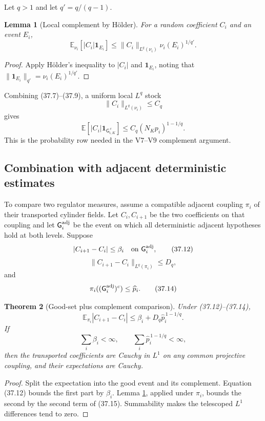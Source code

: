 \documentclass[11pt]{article}
\newtheorem{theorem}{Theorem}[section]
\newtheorem{lemma}[theorem]{Lemma}
\begin{document}
Let \(q>1\) and let \(q'=q/(q-1)\).

\begin{lemma}[Local complement by Hölder]
\label{lem:v11v37-holder}
For a random coefficient \(C_i\) and an event \(E_i\),
\[
 \mathbb E_{\nu_i}
 \left[|C_i|\mathbf1_{E_i}\right]
 \leq
 \|C_i\|_{L^q(\nu_i)}
 \nu_i(E_i)^{1/q'}.
 \tag{37.9}
\]
\end{lemma}

\begin{proof}
Apply Hölder's inequality to
\(|C_i|\) and \(\mathbf1_{E_i}\), noting that
\(\|\mathbf1_{E_i}\|_{q'}=\nu_i(E_i)^{1/q'}\).
\end{proof}

Combining (37.7)--(37.9), a uniform local \(L^q\) stock
\[
 \|C_i\|_{L^q(\nu_i)}\leq C_q
 \tag{37.10}
\]
gives
\[
 \mathbb E\left[
 |C_i|\mathbf1_{\mathsf G_{i,K}^{\,c}}
 \right]
 \leq
 C_q(N_Kp_i)^{1-1/q}.
 \tag{37.11}
\]
This is the probability row needed in the V7--V9 complement argument.

\subsection{Combination with adjacent deterministic estimates}

To compare two regulator measures, assume a compatible adjacent coupling
\(\pi_i\) of their transported cylinder fields.  Let \(C_i,C_{i+1}\)
be the two coefficients on that coupling and let
\(\mathsf G_i^{\rm adj}\) be the event on which all deterministic
adjacent hypotheses hold at both levels.  Suppose
\[
 |C_{i+1}-C_i|
 \leq\beta_i
 \quad\hbox{on }\mathsf G_i^{\rm adj},
 \tag{37.12}
\]
\[
 \|C_{i+1}-C_i\|_{L^q(\pi_i)}\leq D_q,
 \tag{37.13}
\]
and
\[
 \pi_i((\mathsf G_i^{\rm adj})^c)\leq\widehat p_i.
 \tag{37.14}
\]

\begin{theorem}[Good-set plus complement comparison]
\label{thm:v11v37-adjacent}
Under (37.12)--(37.14),
\[
 \mathbb E_{\pi_i}|C_{i+1}-C_i|
 \leq
 \beta_i+D_q\widehat p_i^{\,1-1/q}.
 \tag{37.15}
\]
If
\[
 \sum_i\beta_i<\infty,\qquad
 \sum_i\widehat p_i^{\,1-1/q}<\infty,
 \tag{37.16}
\]
then the transported coefficients are Cauchy in \(L^1\) on any common
projective coupling, and their expectations are Cauchy.
\end{theorem}

\begin{proof}
Split the expectation into the good event and its complement.
Equation (37.12) bounds the first part by \(\beta_i\).
Lemma \ref{lem:v11v37-holder}, applied under \(\pi_i\), bounds the second
by the second term of (37.15).  Summability makes the telescoped
\(L^1\) differences tend to zero.
\end{proof}
\end{document}
